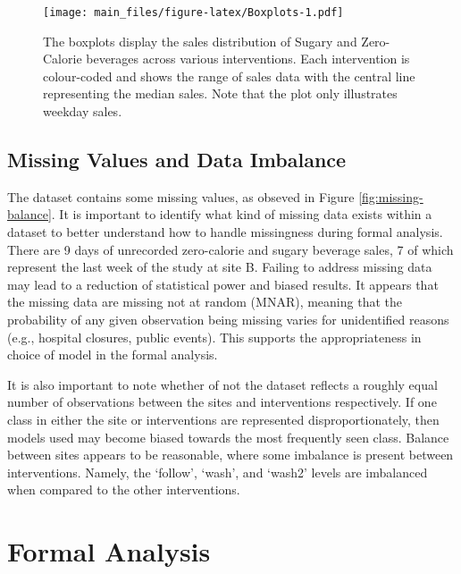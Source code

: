 \documentclass[
]{article}
\begin{document}
\begin{figure}
\centering
\texttt{[image: main\_files/figure-latex/Boxplots-1.pdf]}
\caption{\label{fig:Boxplots}The boxplots display the sales distribution of Sugary and Zero-Calorie beverages across various interventions. Each intervention is colour-coded and shows the range of sales data with the central line representing the median sales. Note that the plot only illustrates weekday sales.}
\end{figure}

\hypertarget{missing-values-and-data-imbalance}{%
\subsection{Missing Values and Data Imbalance}\label{missing-values-and-data-imbalance}}

The dataset contains some missing values, as obseved in Figure \ref{fig:missing-balance}. It is important to identify what kind of missing data exists within a dataset to better understand how to handle missingness during formal analysis. There are 9 days of unrecorded zero-calorie and sugary beverage sales, 7 of which represent the last week of the study at site B. Failing to address missing data may lead to a reduction of statistical power and biased results. It appears that the missing data are missing not at random (MNAR), meaning that the probability of any given observation being missing varies for unidentified reasons (e.g., hospital closures, public events). This supports the appropriateness in choice of model in the formal analysis.

It is also important to note whether of not the dataset reflects a roughly equal number of observations between the sites and interventions respectively. If one class in either the site or interventions are represented disproportionately, then models used may become biased towards the most frequently seen class. Balance between sites appears to be reasonable, where some imbalance is present between interventions. Namely, the `follow', `wash', and `wash2' levels are imbalanced when compared to the other interventions.

\hypertarget{formal-analysis}{%
\section{Formal Analysis}\label{formal-analysis}}
\end{document}
